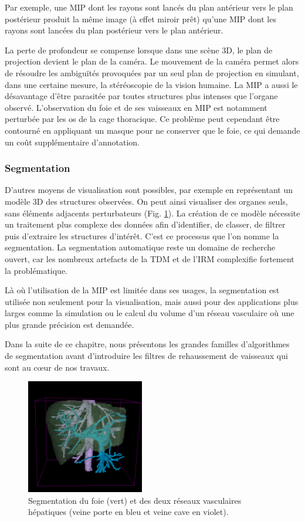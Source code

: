       Par exemple, une MIP dont les rayons sont lancés du plan antérieur vers le plan postérieur produit la même image (à effet miroir prêt) qu'une MIP dont les rayons sont lancées du plan postérieur vers le plan antérieur.

      La perte de profondeur se compense lorsque dans une scène 3D, le plan de projection devient le plan de la caméra. Le mouvement de la caméra permet alors de résoudre les ambiguïtés provoquées par un seul plan de projection en simulant, dans une certaine mesure, la stéréoscopie de la vision humaine.
      La MIP a aussi le désavantage d'être parasitée par toutes structures plus intenses que l'organe observé. L'observation du foie et de ses vaisseaux en MIP est notamment perturbée par les os de la cage thoracique. Ce problème peut cependant être contourné en appliquant un masque pour ne conserver que le foie, ce qui demande un coût supplémentaire d'annotation.

      \subsubsection{Segmentation}
      
      D'autres moyens de visualisation sont possibles, par exemple en représentant un modèle 3D des structures observées. On peut ainsi visualiser des organes seuls, sans éléments adjacents perturbateurs (Fig. \ref{fig:segmentation_3D}). La création de ce modèle nécessite un traitement plus complexe des données afin d'identifier, de classer, de filtrer puis d'extraire les structures d'intérêt. C'est ce processus que l'on nomme la segmentation. La segmentation automatique reste un domaine de recherche ouvert, car les nombreux artefacts de la TDM et de l'IRM complexifie fortement la problématique.
      
      Là où l'utilisation de la MIP est limitée dans ses usages, la segmentation est utilisée non seulement pour la visualisation, mais aussi pour des applications plus larges comme la simulation ou le calcul du volume d'un réseau vasculaire où une plus grande précision est demandée.
      
      Dans la suite de ce chapitre, nous présentons les grandes familles d'algorithmes de segmentation avant d'introduire les filtres de rehaussement de vaisseaux qui sont au cœur de nos travaux.

      \begin{figure}[h]
        \centering
        \includegraphics[height=5cm]{Images/segmentation_3D.png}
        \caption{Segmentation du foie (vert) et des deux réseaux vasculaires hépatiques (veine porte en bleu et veine cave en violet).}
        \label{fig:segmentation_3D}
      \end{figure}
  
